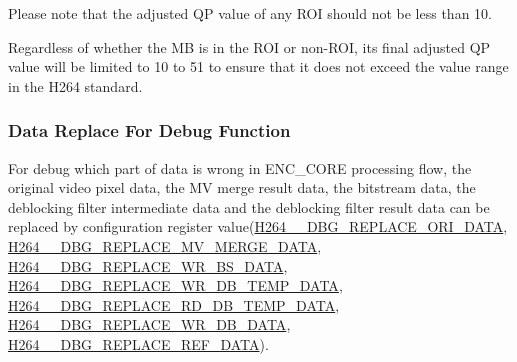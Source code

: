 \documentclass[main\_\_EN.tex]{subfiles}
\begin{document}
Please note that the adjusted QP value of any ROI should not be less than 10.

Regardless of whether the MB is in the ROI or non-ROI, its final adjusted QP value will be limited to 10 to 51 to ensure that it does not exceed the value range in the H264 standard.

\subsubsection{Data Replace For Debug Function}\label{sec:h264-debug-func}
For debug which part of data is wrong in ENC\_CORE processing flow, the original video pixel data, the MV merge result data, the bitstream data, the deblocking filter intermediate data and the deblocking filter result data can be replaced by configuration register value(\hyperref[fielddesc:H264DBGREPLACEORIDATA]{H264\_\_DBG\_REPLACE\_ORI\_DATA}, \hyperref[fielddesc:H264DBGREPLACEMVMERGEDATA]{H264\_\_DBG\_REPLACE\_MV\_MERGE\_DATA}, \hyperref[fielddesc:H264DBGREPLACEWRBSDATA]{H264\_\_DBG\_REPLACE\_WR\_BS\_DATA}, \hyperref[fielddesc:H264DBGREPLACEWRDBTEMPDATA]{H264\_\_DBG\_REPLACE\_WR\_DB\_TEMP\_DATA}, \hyperref[fielddesc:H264DBGREPLACERDDBTEMPDATA]{H264\_\_DBG\_REPLACE\_RD\_DB\_TEMP\_DATA}, \hyperref[fielddesc:H264DBGREPLACEWRDBDATA]{H264\_\_DBG\_REPLACE\_WR\_DB\_DATA}, \hyperref[fielddesc:H264DBGREPLACEREFDATA]{H264\_\_DBG\_REPLACE\_REF\_DATA}).
\end{document}
